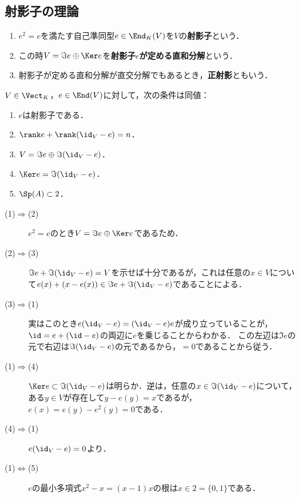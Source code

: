 \documentclass[uplatex,dvipdfmx]{jsarticle}
\begin{document}
\subsection{射影子の理論}

\begin{definition}[projector]\mbox{}
    \begin{enumerate}
        \item $e^2=e$を満たす自己準同型$e\in\End_K(V)$を$V$の\textbf{射影子}という．
        \item この時$V=\Im e\oplus\Ker e$を\textbf{射影子$e$が定める直和分解}という．
        \item 射影子が定める直和分解が直交分解でもあるとき，\textbf{正射影}ともいう．
    \end{enumerate} 
\end{definition}

\begin{proposition}[冪等自己準同型の特徴付け]\label{prop-characterization-of-projector}
    $V\in\Vect_K$，$e\in\End(V)$に対して，次の条件は同値：
    \begin{enumerate}
        \item $e$は射影子である．
        \item $\rank e+\rank(\id_V-e)=n$．
        \item $V=\Im e\oplus\Im(\id_V-e)$．
        \item $\Ker e=\Im(\id_V-e)$．
        \item $\Sp(A)\subset 2$．
    \end{enumerate}
\end{proposition}
\begin{Proof}\mbox{}
    \begin{description}
        \item[(1)$\Rightarrow$(2)] $e^2=e$のとき$V=\Im e\oplus\Ker e$であるため．
        \item[(2)$\Rightarrow$(3)] $\Im e+\Im(\id_V-e)=V$を示せば十分であるが，これは任意の$x\in V$について$e(x)+(x-e(x))\in\Im e+\Im(\id_V-e)$であることによる．
        \item[(3)$\Rightarrow$(1)] 実はこのとき$e(\id_V-e)=(\id_V-e)e$が成り立っていることが，$\id=e+(\id-e)$の両辺に$e$を乗じることからわかる．
        この左辺は$\Im e$の元で右辺は$\Im(\id_V-e)$の元であるから，$=0$であることから従う．
        \item[(1)$\Rightarrow$(4)] $\Ker e\subset\Im(\id_V-e)$は明らか．逆は，任意の$x\in\Im(\id_V-e)$について，ある$y\in V$が存在して$y-e(y)=x$であるが，$e(x)=e(y)-e^2(y)=0$である．
        \item[(4)$\Rightarrow$(1)] $e(\id_V-e)=0$より．
        \item[(1)$\Leftrightarrow$(5)] $e$の最小多項式$x^2-x=(x-1)x$の根は$x\in 2=\{0,1\}$である．
    \end{description}
\end{Proof}
\end{document}
